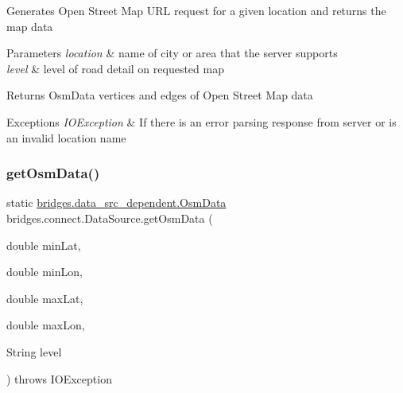 Generates Open Street Map U\+RL request for a given location and returns the map data 
\begin{DoxyParams}{Parameters}
{\em location} & name of city or area that the server supports \\
\hline
{\em level} & level of road detail on requested map \\
\hline
\end{DoxyParams}
\begin{DoxyReturn}{Returns}
Osm\+Data vertices and edges of Open Street Map data 
\end{DoxyReturn}

\begin{DoxyExceptions}{Exceptions}
{\em I\+O\+Exception} & If there is an error parsing response from server or is an invalid location name \\
\hline
\end{DoxyExceptions}
\mbox{\label{classbridges_1_1connect_1_1_data_source_a02158c0c41908db27fc4200bd9c096f4}} 
\subsubsection{\texorpdfstring{get\+Osm\+Data()}{getOsmData()}\hspace{0.1cm}{\footnotesize\ttfamily [2/2]}}
{\footnotesize\ttfamily static \hyperlink{classbridges_1_1data__src__dependent_1_1_osm_data}{bridges.\+data\+\_\+src\+\_\+dependent.\+Osm\+Data} bridges.\+connect.\+Data\+Source.\+get\+Osm\+Data (\begin{DoxyParamCaption}\item[{double}]{min\+Lat,  }\item[{double}]{min\+Lon,  }\item[{double}]{max\+Lat,  }\item[{double}]{max\+Lon,  }\item[{String}]{level }\end{DoxyParamCaption}) throws I\+O\+Exception\hspace{0.3cm}{\ttfamily [static]}}

